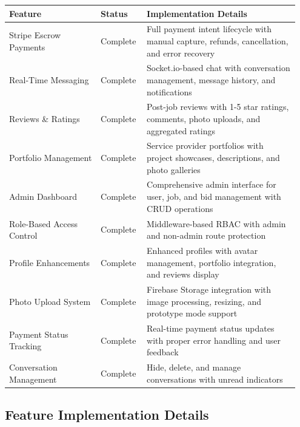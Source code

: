 \documentclass[11pt]{article}
\begin{document}
\begin{longtable}{@{}p{0.30\linewidth} p{0.15\linewidth} p{0.50\linewidth}@{}}
\toprule
\textbf{Feature} & \textbf{Status} & \textbf{Implementation Details} \\
\midrule
\endhead

Stripe Escrow Payments & Complete & Full payment intent lifecycle with manual capture, refunds, cancellation, and error recovery \\
\midrule

Real-Time Messaging & Complete & Socket.io-based chat with conversation management, message history, and notifications \\
\midrule

Reviews \& Ratings & Complete & Post-job reviews with 1-5 star ratings, comments, photo uploads, and aggregated ratings \\
\midrule

Portfolio Management & Complete & Service provider portfolios with project showcases, descriptions, and photo galleries \\
\midrule

Admin Dashboard & Complete & Comprehensive admin interface for user, job, and bid management with CRUD operations \\
\midrule

Role-Based Access Control & Complete & Middleware-based RBAC with admin and non-admin route protection \\
\midrule

Profile Enhancements & Complete & Enhanced profiles with avatar management, portfolio integration, and reviews display \\
\midrule

Photo Upload System & Complete & Firebase Storage integration with image processing, resizing, and prototype mode support \\
\midrule

Payment Status Tracking & Complete & Real-time payment status updates with proper error handling and user feedback \\
\midrule

Conversation Management & Complete & Hide, delete, and manage conversations with unread indicators \\
\bottomrule
\end{longtable}

\subsection{Feature Implementation Details}
\end{document}
